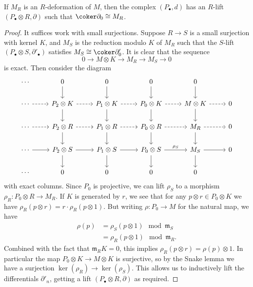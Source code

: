 \begin{lemma}
    If \(M_R\) is an \(R\)-deformation of \(M\), then the complex
    \((P_\bullet,d)\) has an \(R\)-lift \((P_\bullet\otimes R,
    \partial)\) such that \(\coker \partial_0 \cong M_R\).
    \begin{proof}
        It suffices work with small surjections. Suppose \(R\rightarrow S\) is
        a small surjection with kernel \(K\), and \(M_S\) is the reduction
        modulo \(K\) of \(M_R\) such that the \(S\)-lift \((P_\bullet\otimes S,
        \partial'_\bullet)\) satisfies \(M_S\cong \coker \partial'_0\). It is
        clear that the sequence 
        \[0\rightarrow M\otimes K \rightarrow M_R \rightarrow M_S
        \rightarrow 0\] 
        is exact. Then consider the diagram
        \[\begin{tikzcd} 
            \cdots  & 0\arrow[d] & 0\arrow[d] & 0\arrow[d] & 0\arrow[d] & \\
            \cdots \arrow[r, dashed] & P_2\otimes K \arrow[r,dashed]\arrow[d] &
            P_1\otimes K\arrow[r,dashed]\arrow[d] &
            P_0\otimes K\arrow[r,dashed]\arrow[d] & M\otimes K\arrow[r,
            dashed]\arrow[d]
                                                  & 0 \\ 
            \cdots \arrow[r, dashed] & P_2\otimes R \arrow[r, dashed] \arrow[d]
                                     & P_1\otimes R \arrow[r, dashed]\arrow[d] &
            P_0\otimes R \arrow[r,dashed]\arrow[d] & M_{R}
            \arrow[r,dashed]\arrow[d] & 0 \\
            \cdots \arrow[r] & P_2 \otimes S \arrow[r]\arrow[d] &
            P_1\otimes S\arrow[r]\arrow[d] &
            P_0\otimes S\arrow[r, "\rho_S"]\arrow[d] & M_S\arrow[r]\arrow[d]
                                                 & 0 \\ 
            \cdots  & 0 & 0 & 0 & 0 & 
        \end{tikzcd}\]
        with exact columns. Since \(P_0\) is projective, we can lift \(\rho_S\)
        to a morphism \(\rho_R: P_0\otimes R \rightarrow M_R\). If \(K\) is
        generated by \(r\), we see that for any \(p\otimes r \in P_0\otimes K\)
        we have \(\rho_R(p\otimes r) = r\cdot \rho_R(p\otimes 1)\). But writing
        \(\rho: P_0\rightarrow M\) for the natural map, we have 
        \begin{align*}
            \rho(p) &= \rho_S(p\otimes 1) \mod \mathfrak{m}_S \\ &=
            \rho_R(p\otimes 1)\mod \mathfrak{m}_R.
        \end{align*}
        Combined with the fact that \(\mathfrak{m}_RK=0\), this implies
        \(\rho_R(p\otimes r) = \rho(p)\otimes 1\). In particular the map
        \(P_0\otimes K \rightarrow M\otimes K\) is surjective, so by the Snake
        lemma we have a surjection \(\ker(\rho_R)\rightarrow \ker(\rho_S)\). 
        This allows us to inductively lift the differentials
        \(\partial'_n\), getting a lift \((P_\bullet\otimes R,
        \partial)\) as required.
    \end{proof}
\end{lemma}


